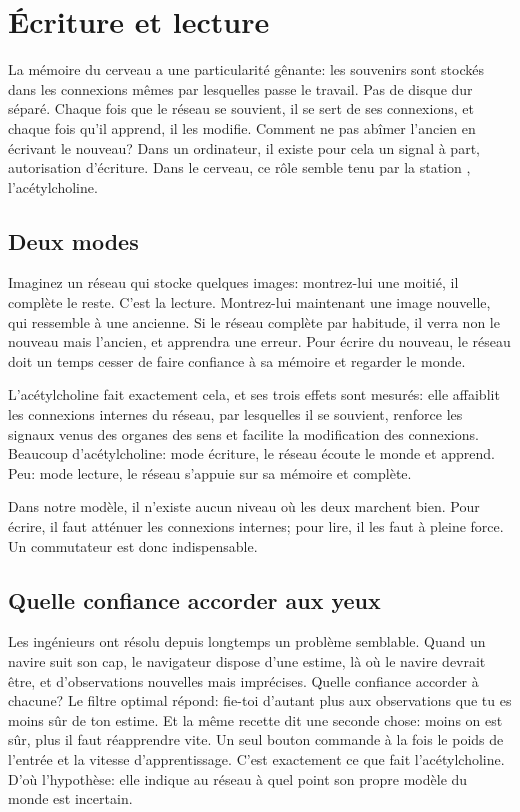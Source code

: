 \chapter{Écriture et lecture}

La mémoire du cerveau a une particularité gênante: les souvenirs sont stockés dans les connexions mêmes par lesquelles passe le travail. Pas de disque dur séparé. Chaque fois que le réseau se souvient, il se sert de ses connexions, et chaque fois qu'il apprend, il les modifie. Comment ne pas abîmer l'ancien en écrivant le nouveau? Dans un ordinateur, il existe pour cela un signal à part, \og autorisation d'écriture\fg{}. Dans le cerveau, ce rôle semble tenu par la station , l'acétylcholine.

\section*{Deux modes}

Imaginez un réseau qui stocke quelques images: montrez-lui une moitié, il complète le reste. C'est la lecture. Montrez-lui maintenant une image nouvelle, qui ressemble à une ancienne. Si le réseau complète par habitude, il verra non le nouveau mais l'ancien, et apprendra une erreur. Pour écrire du nouveau, le réseau doit un temps cesser de faire confiance à sa mémoire et regarder le monde.


L'acétylcholine fait exactement cela, et ses trois effets sont mesurés: elle affaiblit les connexions internes du réseau, par lesquelles il \og se souvient\fg{}, renforce les signaux venus des organes des sens et facilite la modification des connexions. Beaucoup d'acétylcholine: mode écriture, le réseau écoute le monde et apprend. Peu: mode lecture, le réseau s'appuie sur sa mémoire et complète.

Dans notre modèle, il n'existe aucun niveau où les deux marchent bien. Pour écrire, il faut atténuer les connexions internes; pour lire, il les faut à pleine force. Un commutateur est donc indispensable.

\section*{Quelle confiance accorder aux yeux}

Les ingénieurs ont résolu depuis longtemps un problème semblable. Quand un navire suit son cap, le navigateur dispose d'une estime, là où le navire devrait être, et d'observations nouvelles mais imprécises. Quelle confiance accorder à chacune? Le filtre optimal répond: fie-toi d'autant plus aux observations que tu es moins sûr de ton estime. Et la même recette dit une seconde chose: moins on est sûr, plus il faut réapprendre vite. Un seul bouton commande à la fois le poids de l'entrée et la vitesse d'apprentissage. C'est exactement ce que fait l'acétylcholine. D'où l'hypothèse: elle indique au réseau à quel point son propre modèle du monde est incertain.

